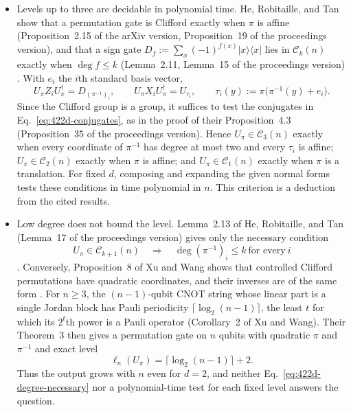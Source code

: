 \begin{itemize}
  \item Levels up to three are decidable in polynomial time.  He, Robitaille, and
  Tan show that a permutation gate is Clifford exactly when $\pi$ is affine
  (Proposition~2.15 of the arXiv version, Proposition~19 of the proceedings
  version), and that a sign gate
  $D_f:=\sum_x(-1)^{f(x)}|x\rangle\langle x|$ lies in $\mathcal C_k(n)$
  exactly when $\deg f\leq k$ (Lemma~2.11, Lemma~15 of the proceedings
  version) .  With $e_i$ the
  $i$th standard basis vector,
  \begin{equation}
    U_\pi Z_iU_\pi^\dagger=D_{(\pi^{-1})_i},
    \qquad
    U_\pi X_iU_\pi^\dagger=U_{\tau_i},
    \qquad
    \tau_i(y):=\pi\bigl(\pi^{-1}(y)+e_i\bigr).
    \label{eq:422d-conjugates}
  \end{equation}
  Since the Clifford group is a group, it suffices to test the conjugates in
  Eq.~\eqref{eq:422d-conjugates}, as in the proof of their Proposition~4.3
  (Proposition~35 of the proceedings version).  Hence
  $U_\pi\in\mathcal C_3(n)$ exactly when every coordinate of $\pi^{-1}$ has
  degree at most two and every $\tau_i$ is affine; $U_\pi\in\mathcal C_2(n)$
  exactly when $\pi$ is affine; and $U_\pi\in\mathcal C_1(n)$ exactly when
  $\pi$ is a translation.  For fixed $d$, composing and expanding the given
  normal forms tests these conditions in time polynomial in $n$.  This
  criterion is a deduction from the cited results.

  \item Low degree does not bound the level.  Lemma~2.13 of He, Robitaille, and
  Tan (Lemma~17 of the proceedings version) gives only the necessary condition
  \begin{equation}
    U_\pi\in\mathcal C_{k+1}(n)
    \quad\Longrightarrow\quad
    \deg(\pi^{-1})_i\leq k\ \text{for every}\ i
    \label{eq:422d-degree-necessary}
  \end{equation}
  .  Conversely, Proposition~8
  of Xu and Wang shows that controlled Clifford permutations have quadratic
  coordinates, and their inverses are of the same form
  .  For $n\geq3$, the $(n-1)$-qubit CNOT
  string whose linear part is a single Jordan block has Pauli periodicity
  $\lceil\log_2(n-1)\rceil$, the least $t$ for which its $2^t$th power is a
  Pauli operator (Corollary~2 of Xu and Wang).  Their Theorem~3 then gives a
  permutation gate on $n$ qubits with quadratic $\pi$ and $\pi^{-1}$ and exact
  level
  \begin{equation}
    \ell_n(U_\pi)=\lceil\log_2(n-1)\rceil+2.
    \label{eq:422d-growing-level}
  \end{equation}
  Thus the output grows with $n$ even for $d=2$, and neither
  Eq.~\eqref{eq:422d-degree-necessary} nor a polynomial-time test for each
  fixed level answers the question.


\end{itemize}
